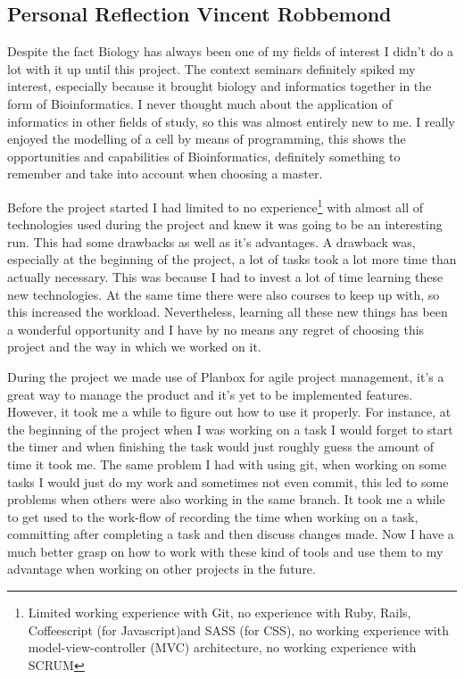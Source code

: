 \documentclass[10pt,a4paper]{article}
\begin{document}
\subsection*{Personal Reflection Vincent Robbemond}
Despite the fact Biology has always been one of my fields of interest I didn't do a lot with it up until this project. The context seminars definitely spiked my interest, especially because it brought biology and informatics together in the form of Bioinformatics. I never thought much about the application of informatics in other fields of study, so this was almost entirely new to me. I really enjoyed the modelling of a cell by means of programming, this shows the opportunities and capabilities of Bioinformatics, definitely something to remember and take into account when choosing a master.

Before the project started I had limited to no experience\footnote{Limited working experience with Git, no experience with Ruby, Rails, Coffeescript (for Javascript)and SASS (for CSS), no working experience with model-view-controller (MVC) architecture, no working experience with SCRUM} with almost all of technologies used during the project and knew it was going to be an interesting run. This had some drawbacks as well as it's advantages. A drawback was, especially at the beginning of the project, a lot of tasks took a lot more time than actually necessary. This was because I had to invest a lot of time learning these new technologies. At the same time there were also courses to keep up with, so this increased the workload. Nevertheless, learning all these new things has been a wonderful opportunity and I have by no means any regret of choosing this project and the way in which we worked on it.

During the project we made use of Planbox for agile project management, it's a great way to  manage the product and it's yet to be implemented features. However, it took me a while to figure out how to use it properly. For instance, at the beginning of the project when I was working on a task I would forget to start the timer and when finishing the task would just roughly guess the amount of time it took me. The same problem I had with using git, when working on some tasks I would just do my work and sometimes not even commit, this led to some problems when others were also working in the same branch. It took me a while to get used to the work-flow of recording the time when working on a task, committing after completing a task and then discuss changes made. Now I have a much better grasp on how to work with these kind of tools and use them to my advantage when working on other projects in the future.
\end{document}
